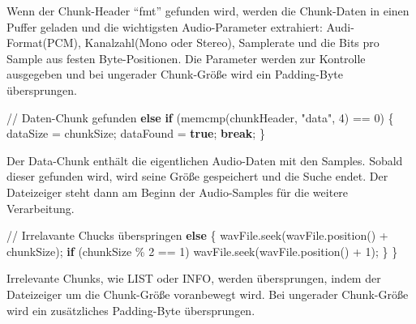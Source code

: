\documentclass[
  ngerman,
  letterpaper,
  DIV=11]{scrreprt}
\newenvironment{Shaded}{\begin{snugshade}}{\end{snugshade}}
\newcommand{\CommentTok}[1]{\textcolor[rgb]{0.37,0.37,0.37}{#1}}
\newcommand{\ControlFlowTok}[1]{\textcolor[rgb]{0.00,0.23,0.31}{\textbf{#1}}}
\newcommand{\DecValTok}[1]{\textcolor[rgb]{0.68,0.00,0.00}{#1}}
\newcommand{\KeywordTok}[1]{\textcolor[rgb]{0.00,0.23,0.31}{\textbf{#1}}}
\newcommand{\NormalTok}[1]{\textcolor[rgb]{0.00,0.23,0.31}{#1}}
\newcommand{\OperatorTok}[1]{\textcolor[rgb]{0.37,0.37,0.37}{#1}}
\newcommand{\StringTok}[1]{\textcolor[rgb]{0.13,0.47,0.30}{#1}}
\begin{document}
Wenn der Chunk-Header ``fmt'' gefunden wird, werden die Chunk-Daten in
einen Puffer geladen und die wichtigsten Audio-Parameter extrahiert:
Audi-Format(PCM), Kanalzahl(Mono oder Stereo), Samplerate und die Bits
pro Sample aus festen Byte-Positionen. Die Parameter werden zur
Kontrolle ausgegeben und bei ungerader Chunk-Größe wird ein Padding-Byte
übersprungen.

\begin{Shaded}
\begin{Highlighting}[]
\CommentTok{// Daten{-}Chunk gefunden}
\ControlFlowTok{else} \ControlFlowTok{if} \OperatorTok{(}\NormalTok{memcmp}\OperatorTok{(}\NormalTok{chunkHeader}\OperatorTok{,} \StringTok{"data"}\OperatorTok{,} \DecValTok{4}\OperatorTok{)} \OperatorTok{==} \DecValTok{0}\OperatorTok{)} \OperatorTok{\{}
\NormalTok{  dataSize }\OperatorTok{=}\NormalTok{ chunkSize}\OperatorTok{;}
\NormalTok{  dataFound }\OperatorTok{=} \KeywordTok{true}\OperatorTok{;}
  \ControlFlowTok{break}\OperatorTok{;}
\OperatorTok{\}}
\end{Highlighting}
\end{Shaded}

Der Data-Chunk enthält die eigentlichen Audio-Daten mit den Samples.
Sobald dieser gefunden wird, wird seine Größe gespeichert und die Suche
endet. Der Dateizeiger steht dann am Beginn der Audio-Samples für die
weitere Verarbeitung.

\begin{Shaded}
\begin{Highlighting}[]
  \CommentTok{// Irrelavante Chucks überspringen}
  \ControlFlowTok{else} \OperatorTok{\{}
\NormalTok{    wavFile}\OperatorTok{.}\NormalTok{seek}\OperatorTok{(}\NormalTok{wavFile}\OperatorTok{.}\NormalTok{position}\OperatorTok{()} \OperatorTok{+}\NormalTok{ chunkSize}\OperatorTok{);}
    \ControlFlowTok{if} \OperatorTok{(}\NormalTok{chunkSize }\OperatorTok{\%} \DecValTok{2} \OperatorTok{==} \DecValTok{1}\OperatorTok{)}\NormalTok{ wavFile}\OperatorTok{.}\NormalTok{seek}\OperatorTok{(}\NormalTok{wavFile}\OperatorTok{.}\NormalTok{position}\OperatorTok{()} \OperatorTok{+} \DecValTok{1}\OperatorTok{);}
  \OperatorTok{\}}
\OperatorTok{\}}
\end{Highlighting}
\end{Shaded}

Irrelevante Chunks, wie LIST oder INFO, werden übersprungen, indem der
Dateizeiger um die Chunk-Größe voranbewegt wird. Bei ungerader
Chunk-Größe wird ein zusätzliches Padding-Byte übersprungen.
\end{document}
